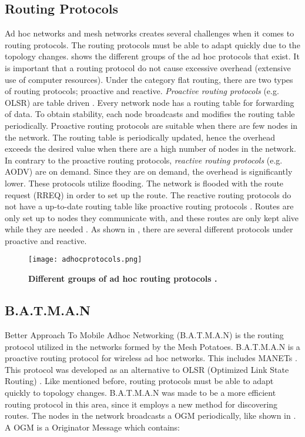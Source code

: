 \subsection{Routing Protocols}
Ad hoc networks and mesh networks creates several challenges when it comes to routing protocols. The routing protocols must be able to adapt quickly due to the topology changes.  shows the different groups of the ad hoc protocols that exist. It is important that a routing protocol do not cause excessive overhead (extensive use of computer resources). Under the category flat routing, there are two types of routing protocols; proactive and reactive. \textit{Proactive routing protocols} (e.g. OLSR) are table driven \citep{proactivereactive}. Every network node has a routing table for forwarding of data. To obtain stability, each node broadcasts and modifies the routing table periodically. Proactive routing protocols are suitable when there are few nodes in the network. The routing table is periodically updated, hence the overhead exceeds the desired value when there are a high number of nodes in the network. In contrary to the proactive routing protocols, \textit{reactive routing protocols} (e.g. AODV) are on demand. Since they are on demand, the overhead is significantly lower. These protocols utilize flooding. The network is flooded with the route request (RREQ) in order to set up the route. The reactive routing protocols do not have a up-to-date routing table like proactive routing protocols \cite{proactivereactive}. Routes are only set up to nodes they communicate with, and these routes are only kept alive while they are needed  \cite{adhoc2}. As shown in , there are several different protocols under proactive and reactive. 


\begin{figure}[t]
  \centering
    \texttt{[image: adhocprotocols.png]}
     \caption[Ad Hoc routing protocols]{\textbf{Different groups of ad hoc routing protocols \cite{adhoc}.}}
\label{fig:adhocprotocols}
\end{figure}


\subsection{B.A.T.M.A.N}
\label{subsec:batman}
Better Approach To Mobile Adhoc Networking (B.A.T.M.A.N) is the routing protocol utilized in the networks formed by the Mesh Potatoes. B.A.T.M.A.N is a proactive routing protocol for wireless ad hoc networks. This includes MANETs \cite{batman}. This protocol was developed as an alternative to OLSR (Optimized Link State Routing) \cite{batman2}. Like mentioned before, routing protocols must be able to adapt quickly to topology changes. B.A.T.M.A.N was made to be a more efficient routing protocol in this area, since it employs a new method for discovering routes. The nodes in the network broadcasts a OGM periodically, like shown in . A OGM is a Originator Message which contains: 

